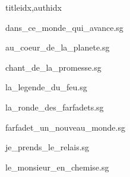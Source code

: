\documentclass[12pt]{article}
\begin{document}
\begin{songs}{titleidx,authidx}

{dans_ce_monde_qui_avance.sg}


{au_coeur_de_la_planete.sg}


{chant_de_la_promesse.sg}


{la_legende_du_feu.sg}


{la_ronde_des_farfadets.sg}


{farfadet_un_nouveau_monde.sg}


{je_prends_le_relais.sg}


{le_monsieur_en_chemise.sg}



\end{songs}
\end{document}
